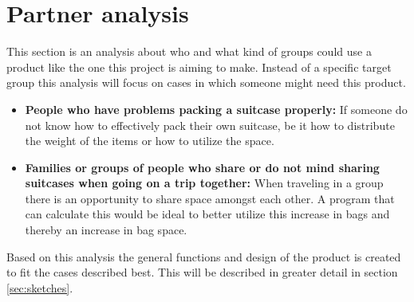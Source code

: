 \section{Partner analysis}
This section is an analysis about who and what kind of groups could use a product like the one this project is aiming to make.
Instead of a specific target group this analysis will focus on cases in which someone might need this product.
\begin{itemize}
\item \textbf{People who have problems packing a suitcase properly:}\newline
If someone do not know how to effectively pack their own suitcase, be it how to distribute the weight of the items or how to utilize the space.

\item \textbf{Families or groups of people who share or do not mind sharing suitcases when going on a trip together:}\newline
When traveling in a group there is an opportunity to share space amongst each other. A program that can calculate this would be ideal to better utilize this increase in bags and thereby an increase in bag space. 
\end{itemize}

Based on this analysis the general functions and design of the product is created to fit the cases described best. This will be described in greater detail in section \ref{sec:sketches}.